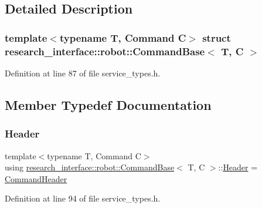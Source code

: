 \subsection{Detailed Description}
\subsubsection*{template$<$typename T, Command C$>$\newline
struct research\+\_\+interface\+::robot\+::\+Command\+Base$<$ T, C $>$}



Definition at line 87 of file service\+\_\+types.\+h.



\subsection{Member Typedef Documentation}
\mbox{\label{structresearch__interface_1_1robot_1_1CommandBase_a886b3326733fe168fc4f6d52f3a58740}} 
\subsubsection{\texorpdfstring{Header}{Header}}
{\footnotesize\ttfamily template$<$typename T, Command C$>$ \\
using \hyperlink{structresearch__interface_1_1robot_1_1CommandBase}{research\+\_\+interface\+::robot\+::\+Command\+Base}$<$ T, C $>$\+::\hyperlink{structresearch__interface_1_1robot_1_1CommandBase_a886b3326733fe168fc4f6d52f3a58740}{Header} =  \hyperlink{structresearch__interface_1_1robot_1_1CommandHeader}{Command\+Header}}



Definition at line 94 of file service\+\_\+types.\+h.

\mbox{\label{structresearch__interface_1_1robot_1_1CommandBase_a969e615ce65a1309081591db384095d7}} 
